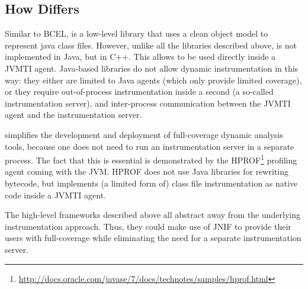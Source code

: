 \subsection*{How \jnif{} Differs}

Similar to BCEL, \jnif{} is a low-level library that uses a clean object model to represent java class files.
However, unlike all the libraries described above,
\jnif{} is not implemented in Java, but in C++.
This allows \jnif{} to be used directly inside a JVMTI agent. 
Java-based libraries do not allow dynamic instrumentation in this way:
they either are limited to Java agents (which only provide limited coverage),
or they require out-of-process instrumentation inside a second \jvm{} (a so-called instrumentation server),
and inter-process communication between the JVMTI agent and the instrumentation server.

\jnif{} simplifies the development and deployment of full-coverage dynamic analysis tools,
because one does not need to run an instrumentation server in a separate \jvm{} process.
The fact that this is essential is demonstrated by the HPROF\footnote{\url{http://docs.oracle.com/javase/7/docs/technotes/samples/hprof.html}} profiling agent coming with the JVM.
HPROF does not use Java libraries for rewriting bytecode,
but implements (a limited form of) class file instrumentation as native code inside a JVMTI agent.

The high-level frameworks described above all abstract away from the underlying instrumentation approach.
Thus, they could make use of JNIF to provide their users with full-coverage 
while eliminating the need for a separate instrumentation server.


